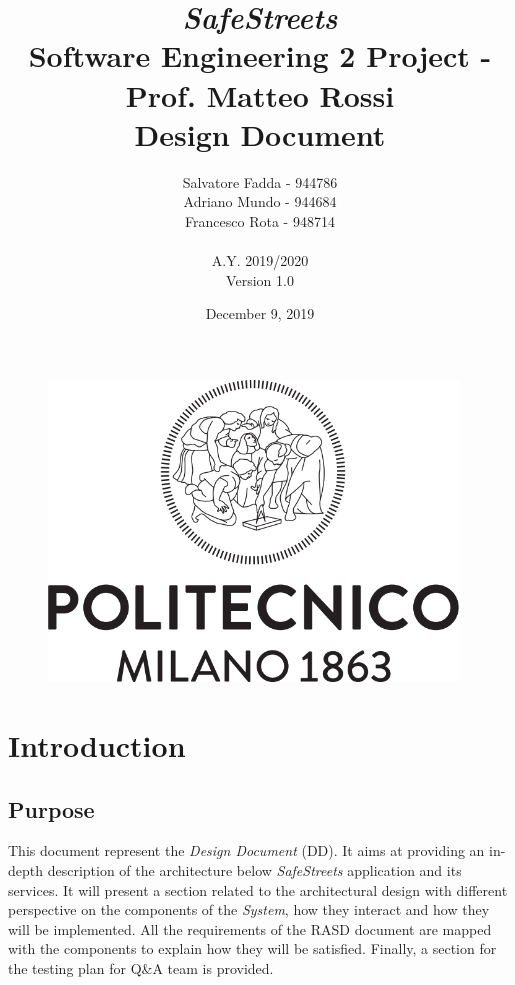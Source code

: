\documentclass{article}
\begin{document}
\begin{figure}
\centering
	\includegraphics[height=8cm]{Images/polimi_logo}
\end{figure}
	
\title {{\Huge \it SafeStreets} \\ \Large Software Engineering 2 Project - Prof. Matteo Rossi \\ {\bf Design Document}}
\author{Salvatore Fadda - 944786\\Adriano Mundo - 944684 \\ Francesco Rota - 948714
		\\ \\ A.Y. 2019/2020 \\ Version 1.0}
\date{December 9, 2019}	

\maketitle
\newpage

\tableofcontents
\newpage

\section{Introduction}
	\subsection{Purpose}
	This document represent the {\it Design Document} (DD). It aims at providing an in-depth description of the architecture below {\it SafeStreets} application and its services. It will present a section related to the architectural design with different perspective on the components of the {\it System}, how they interact and how they will be implemented. All the requirements of the RASD document are mapped with the components to explain how they will be satisfied. Finally, a section for the testing plan for Q\&A team is provided.
		
\end{document}
